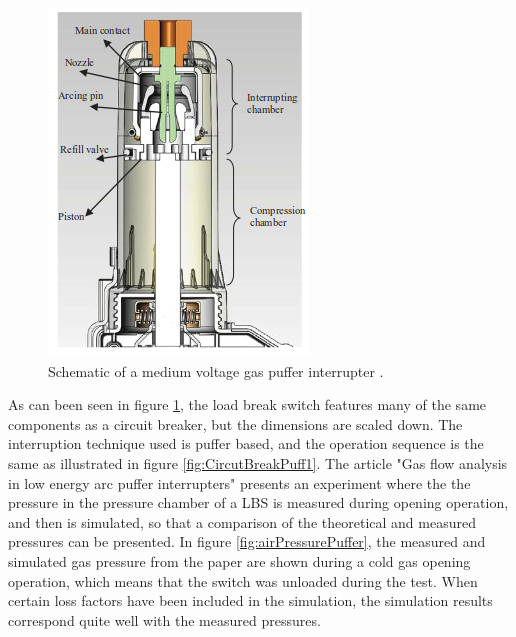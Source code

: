 \documentclass[10pt,b5paper,twoside]{article}
\begin{document}
\begin{figure} [H]
\centering
\includegraphics[scale=0.6]{Bilder/Theory/LBSselfblastandPuffer.png}
\caption{Schematic of a medium voltage gas puffer interrupter \cite{bib:GFALEAPI}.} \label{fig:selfBlastandPuffer}
\end{figure}

As can been seen in figure \ref{fig:selfBlastandPuffer}, the load break switch features many of the same components as a circuit breaker, but the dimensions are scaled down. The interruption technique used is puffer based, and the operation sequence is the same as illustrated in figure \ref{fig:CircutBreakPuff1}. The article "Gas flow analysis in low energy arc puffer interrupters" \cite{bib:GFALEAPI} presents an experiment where the the pressure in the pressure chamber of a LBS is measured during opening operation, and then is simulated, so that a comparison of the theoretical and measured pressures can be presented. In figure \ref{fig:airPressurePuffer}, the measured and simulated gas pressure from the paper are shown during a cold gas opening operation, which means that the switch was unloaded during the test. When certain loss factors have been included in the simulation, the simulation results correspond quite well with the measured pressures.
\end{document}
